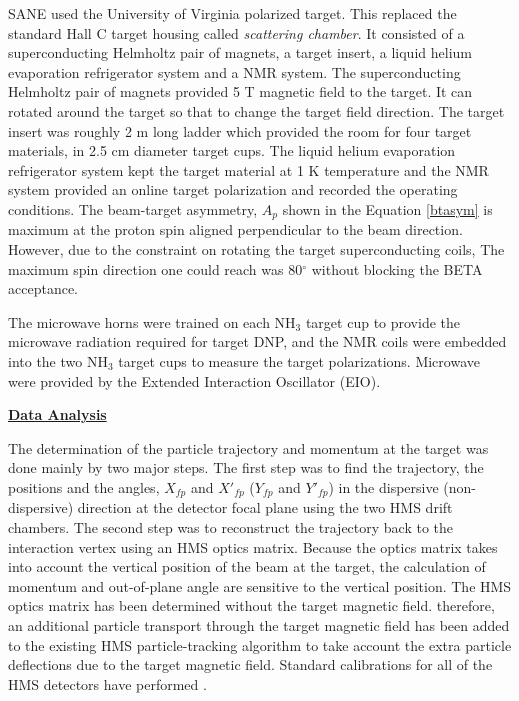 \documentclass[12pt]{article}
\begin{document}

SANE used the University of Virginia polarized target. This replaced the standard Hall C target housing called \emph{scattering chamber}. It consisted of a superconducting Helmholtz pair of magnets, a target insert, a liquid helium evaporation refrigerator system and a NMR system.
The superconducting Helmholtz pair of magnets provided 5 T magnetic field to the target. It can rotated around the target so that to change the target field direction. The target insert was roughly 2 m long ladder which provided the room for four target materials, in 2.5 cm diameter target cups. The liquid helium evaporation refrigerator system kept the target material at 1 K temperature and the NMR system provided an online target polarization and recorded the operating conditions. 
The beam-target asymmetry, $A_p$ shown in the Equation \eqref{btasym} is maximum at the proton spin aligned perpendicular to the beam direction. However, due to the constraint on rotating the target superconducting coils, The maximum spin direction one could reach was 80$^{\circ}$ without blocking the BETA acceptance.

The microwave horns were trained on each NH$_3$ target cup to provide the microwave radiation required for target DNP, and the NMR coils were embedded into the two NH$_3$ target cups to measure the target polarizations. Microwave were provided by the Extended Interaction Oscillator (EIO). 

\vspace{8 mm}
{
\raggedleft
\underline{\textbf{Data Analysis}}
}

The determination of the particle trajectory and momentum at the target was done mainly by two major steps. The first step was to find the trajectory, the positions and the angles, $X_{fp}$ and $X'_{fp}$ ($Y_{fp}$ and $Y'_{fp}$) in the dispersive (non-dispersive) direction at the detector focal plane using the two HMS drift chambers. The second step was to reconstruct the trajectory back to the interaction vertex using an HMS optics matrix. Because the optics matrix takes into account the vertical position of the beam at the target, the calculation of momentum and out-of-plane angle are sensitive to the vertical position. The HMS optics matrix has been determined without the target magnetic field. therefore, an additional particle transport through the target magnetic field has been added to the existing HMS particle-tracking algorithm to take account the extra particle deflections due to the target magnetic field. Standard calibrations for all of the HMS detectors have performed \cite{110}.
\end{document}
